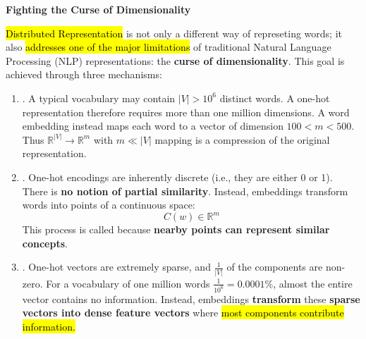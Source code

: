 \highspace
\begin{flushleft}
    \textcolor{Green3}{ \textbf{Fighting the Curse of Dimensionality}}
\end{flushleft}
\hl{Distributed Representation} is not only a different way of represeting words; it also \hl{addresses one of the major limitations} of traditional Natural Language Processing (NLP) representations: the \textbf{curse of dimensionality}. This goal is achieved through three mechanisms:
\begin{enumerate}
    \item {}. A typical vocabulary may contain $\left|V\right| > 10^{6}$ distinct words. A one-hot representation therefore requires more than one million dimensions. A word embedding instead maps each word to a vector of dimension $100 < m < 500$. Thus $\mathbb{R}^{\left|V\right|} \to \mathbb{R}^{m}$ with $m \ll \left|V\right|$ mapping is a compression of the original representation.
    
    
    \item {}. One-hot encodings are inherently discrete (i.e., they are either 0 or 1). There is \textbf{no notion of partial similarity}. Instead, embeddings transform words into points of a continuous space:
    \begin{equation*}
        C\left(w\right) \in \mathbb{R}^{m}
    \end{equation*}
    This process is called  because \textbf{nearby points can represent similar concepts}.
    
    
    \item {}. One-hot vectors are extremely sparse, and $\frac{1}{\left|V\right|}$ of the components are non-zero. For a vocabulary of one million words $\frac{1}{10^{6}} = 0.0001\%$, almost the entire vector contains no information. Instead, embeddings \textbf{transform} these \textbf{sparse vectors into dense feature vectors} where \hl{most components contribute information.}
\end{enumerate}
